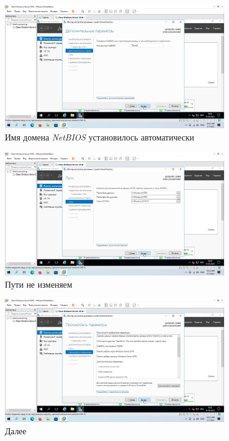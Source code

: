 \documentclass[a4paper]{article}
\begin{document}
  \begin{figure}[H]
    \centering
    \includegraphics[width=0.85\textwidth]{9_0055}
    \caption{Имя домена \textit{NetBIOS} установилось автоматически}
    \label{img:0055}
  \end{figure}

  \begin{figure}[H]
    \centering
    \includegraphics[width=0.85\textwidth]{9_0056}
    \caption{Пути не изменяем}
    \label{img:0056}
  \end{figure}

  \begin{figure}[H]
    \centering
    \includegraphics[width=0.85\textwidth]{9_0057}
    \caption{Далее}
    \label{img:0057}
  \end{figure}
\end{document}

